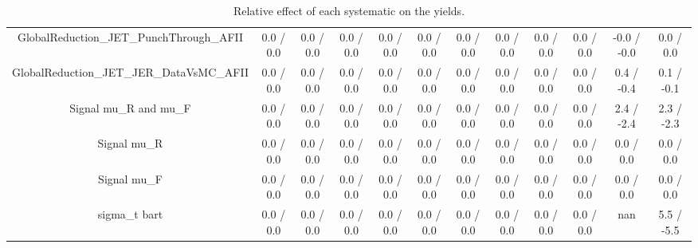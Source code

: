 \begin{table}[htbp]
\begin{center}
\begin{tabular}{|c|c|c|c|c|c|c|c|c|c|c|c|}
  GlobalReduction_JET_PunchThrough_AFII & 0.0 / 0.0 & 0.0 / 0.0 & 0.0 / 0.0 & 0.0 / 0.0 & 0.0 / 0.0 & 0.0 / 0.0 & 0.0 / 0.0 & 0.0 / 0.0 & 0.0 / 0.0 & -0.0 / -0.0 & 0.0 / 0.0 \\ 
  GlobalReduction_JET_JER_DataVsMC_AFII & 0.0 / 0.0 & 0.0 / 0.0 & 0.0 / 0.0 & 0.0 / 0.0 & 0.0 / 0.0 & 0.0 / 0.0 & 0.0 / 0.0 & 0.0 / 0.0 & 0.0 / 0.0 & 0.4 / -0.4 & 0.1 / -0.1 \\ 
  Signal  mu_{R} and  mu_{F} & 0.0 / 0.0 & 0.0 / 0.0 & 0.0 / 0.0 & 0.0 / 0.0 & 0.0 / 0.0 & 0.0 / 0.0 & 0.0 / 0.0 & 0.0 / 0.0 & 0.0 / 0.0 & 2.4 / -2.4 & 2.3 / -2.3 \\ 
  Signal  mu_{R} & 0.0 / 0.0 & 0.0 / 0.0 & 0.0 / 0.0 & 0.0 / 0.0 & 0.0 / 0.0 & 0.0 / 0.0 & 0.0 / 0.0 & 0.0 / 0.0 & 0.0 / 0.0 & 0.0 / 0.0 & 0.0 / 0.0 \\ 
  Signal  mu_{F} & 0.0 / 0.0 & 0.0 / 0.0 & 0.0 / 0.0 & 0.0 / 0.0 & 0.0 / 0.0 & 0.0 / 0.0 & 0.0 / 0.0 & 0.0 / 0.0 & 0.0 / 0.0 & 0.0 / 0.0 & 0.0 / 0.0 \\ 
   sigma_{t bar{t}} & 0.0 / 0.0 & 0.0 / 0.0 & 0.0 / 0.0 & 0.0 / 0.0 & 0.0 / 0.0 & 0.0 / 0.0 & 0.0 / 0.0 & 0.0 / 0.0 & 0.0 / 0.0 &    nan    & 5.5 / -5.5 \\ 
\hline 
\end{tabular} 
\caption{Relative effect of each systematic on the yields.} 
\end{center} 
\end{table} 
